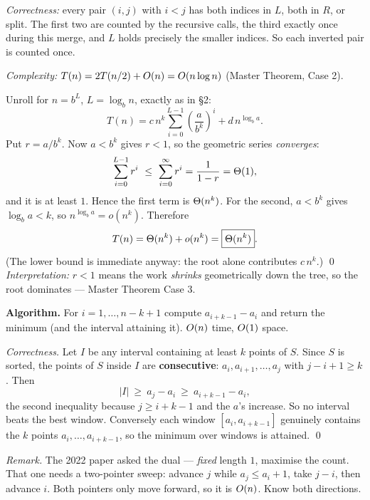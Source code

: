 \emph{Correctness:} every pair $(i,j)$ with $i<j$ has both indices in $L$, both in $R$, or split.
The first two are counted by the recursive calls, the third exactly once during this merge, and
$L$ holds precisely the smaller indices. So each inverted pair is counted once.

\emph{Complexity:} $T(n)=2T(n/2)+O(n)=O(n\log n)$ (Master Theorem, Case 2).

 Unroll for $n=b^L$, $L=\log_b n$, exactly as in \S2:
\[
  T(n)=c\,n^k\sum_{i=0}^{L-1}\left(\frac{a}{b^k}\right)^{\!i}+d\,n^{\log_b a}.
\]
Put $r=a/b^k$. Now $a<b^k$ gives $r<1$, so the geometric series \emph{converges}:
\[
  \sum_{i=0}^{L-1}r^i\ \le\ \sum_{i=0}^{\infty}r^i=\frac{1}{1-r}=\Th1 ,
\]
and it is at least $1$. Hence the first term is $\Theta(n^k)$. For the second, $a<b^k$ gives
$\log_b a<k$, so $n^{\log_b a}=o(n^k)$. Therefore
\[
  T(n)=\Theta(n^k)+o(n^k)=\boxed{\Theta(n^k)} .
\]
(The lower bound is immediate anyway: the root alone contributes $c\,n^k$.) \qed
\emph{Interpretation:} $r<1$ means the work \emph{shrinks} geometrically down the tree, so the
root dominates --- Master Theorem Case 3.

\textbf{Algorithm.} For $i=1,\dots,n-k+1$ compute $a_{i+k-1}-a_i$ and return the minimum (and the
interval attaining it). $O(n)$ time, $O(1)$ space.

\emph{Correctness.} Let $I$ be any interval containing at least $k$ points of $S$. Since $S$ is
sorted, the points of $S$ inside $I$ are \textbf{consecutive}: $a_i,a_{i+1},\dots,a_j$ with
$j-i+1\ge k$. Then
\[
  |I|\ \ge\ a_j-a_i\ \ge\ a_{i+k-1}-a_i,
\]
the second inequality because $j\ge i+k-1$ and the $a$'s increase. So no interval beats the best
window. Conversely each window $[a_i,a_{i+k-1}]$ genuinely contains the $k$ points
$a_i,\dots,a_{i+k-1}$, so the minimum over windows is attained. \qed

\emph{Remark.} The 2022 paper asked the dual --- \emph{fixed} length $1$, maximise the count. That
one needs a two-pointer sweep: advance $j$ while $a_j\le a_i+1$, take $j-i$, then advance $i$.
Both pointers only move forward, so it is $O(n)$. Know both directions.

